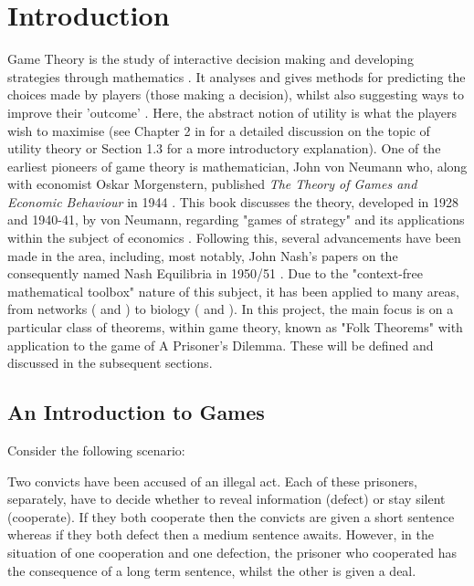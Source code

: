 \chapter{Introduction}

Game Theory is the study of interactive decision making and developing
strategies through mathematics \cite{Dictionary2013}. It analyses and gives
methods for predicting the choices made by players (those making a decision),
whilst also suggesting ways to improve their 'outcome'
\cite{maschler_solan_zamir_2013}. Here, the abstract notion of utility is what
the players wish to maximise (see Chapter 2 in \cite{maschler_solan_zamir_2013}
for a detailed discussion on the topic of utility theory or Section 1.3
\cite{Webb2007} for a more introductory explanation). One of the earliest
pioneers of game theory is mathematician, John von Neumann who, along with
economist Oskar Morgenstern, published \textit{The Theory of Games and Economic
Behaviour} in 1944 \cite{maschler_solan_zamir_2013}. This book discusses the
theory, developed in 1928 and 1940-41, by von Neumann, regarding "games of
strategy" and its applications within the subject of economics
\cite{von2007theory}. Following this, several advancements have been made in the
area, including, most notably, John Nash's papers on the consequently named Nash
Equilibria in 1950/51 \cite{nash1950equilibrium, nash1951non}. Due to the
"context-free mathematical toolbox" \cite{maschler_solan_zamir_2013} nature of
this subject, it has been applied to many areas, from networks
(\cite{liang2012game} and \cite{1593279}) to biology (\cite{chen2009robust} and
\cite{adeoye2012application}). In this project, the main focus is on a
particular class of theorems, within game theory, known as "Folk Theorems" with
application to the game of A Prisoner's Dilemma. These will be defined and
discussed in the subsequent sections.

\section{An Introduction to Games}\label{GamesIntro}
Consider the following scenario:

\begin{center}
    Two convicts have been accused of an illegal act. Each of these prisoners,
    separately, have to decide whether to reveal information (defect) or stay
    silent (cooperate). If they both cooperate then the convicts are given a
    short sentence whereas if they both defect then a medium sentence awaits.
    However, in the situation of one cooperation and one defection, the prisoner
    who cooperated has the consequence of a long term sentence, whilst the other
    is given a deal. \cite{Knight2017}
\end{center}

